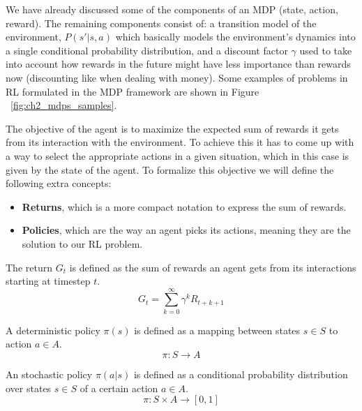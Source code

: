 We have already discussed some of the components of an MDP (state, action, reward).
The remaining components consist of: a transition model of the environment, $P(s'|s,a)$
which basically models the environment's dynamics into a single conditional probability
distribution, and a discount factor $\gamma$ used to take into account how rewards in the future might have
less importance than rewards now (discounting like when dealing with money). Some examples 
of problems in RL formulated in the MDP framework are shown in Figure ~\ref{fig:ch2_mdps_samples}.

\figMdpSamples

The objective of the agent is to maximize the expected sum of rewards it gets from
its interaction with the environment. To achieve this it has to come up with a
way to select the appropriate actions in a given situation, which in this case is given
by the state of the agent. To formalize this objective we will define the following extra concepts:

\begin{itemize}
    \item \textbf{Returns}, which is a more compact notation to express the sum of rewards.
    \item \textbf{Policies}, which are the way an agent picks its actions, meaning they
          are the solution to our RL problem.
\end{itemize}

\newpage

\begin{definition}
    The return $G_{t}$ is defined as the sum of rewards an agent gets from its
    interactions starting at timestep $t$.
    \begin{equation}
        G_{t} = \sum_{k=0}^{\infty} \gamma^{k} R_{t+k+1}
    \end{equation}
\end{definition}

\begin{definition}
    A deterministic policy $\pi(s)$ is defined as a mapping between states $s \in S$
    to action $a \in A$.
    \begin{equation}
        \pi : S \rightarrow A
    \end{equation}
\end{definition}

\begin{definition}
    An stochastic policy $\pi(a|s)$ is defined as a conditional probability distribution over
    states $s \in S$ of a certain action $a \in A$.
    \begin{equation}
        \pi : S \times A \rightarrow [0,1]
    \end{equation}
\end{definition}

